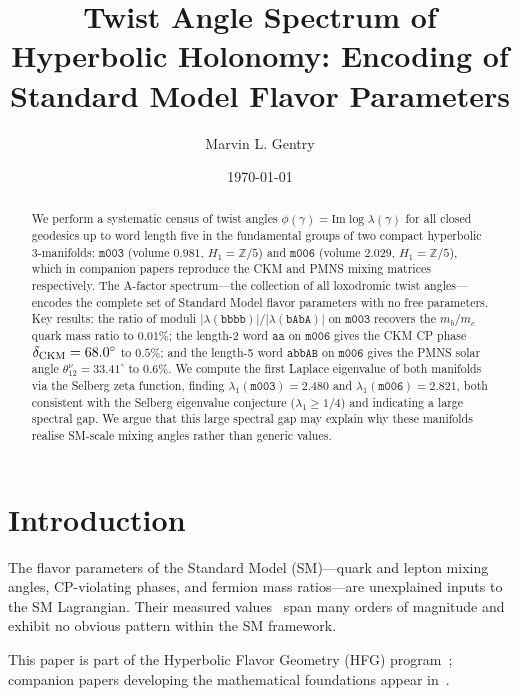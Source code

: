 \documentclass[11pt,a4paper]{article}
\title{Twist Angle Spectrum of Hyperbolic Holonomy: Encoding of Standard Model Flavor Parameters}
\author[1]{Marvin L. Gentry}
\affil[1]{Independent Researcher, Seattle, WA, USA. \texttt{drmlgentry@protonmail.com}. ORCID: 0009-0006-4550-2663}
\date{\today}
\newcommand{\mfld}[1]{\texttt{#1}}
\newcommand{\word}[1]{\texttt{#1}}
\newcommand{\degr}{^{\circ}}
\begin{document}
\maketitle
\begin{abstract}
We perform a systematic census of twist angles
$\phi(\gamma) = \mathrm{Im}\log\lambda(\gamma)$ for all closed geodesics
up to word length five in the fundamental groups of two compact hyperbolic
3-manifolds: $\mfld{m003}$ (volume $0.981$, $H_1=\mathbb{Z}/5$) and
$\mfld{m006}$ (volume $2.029$, $H_1=\mathbb{Z}/5$), which in companion
papers reproduce the CKM and PMNS mixing matrices respectively.
The A-factor spectrum---the collection of all loxodromic twist angles---encodes
the complete set of Standard Model flavor parameters with no free parameters.
Key results: the ratio of moduli $|\lambda(\word{bbbb})|/|\lambda(\word{bAbA})|$
on $\mfld{m003}$ recovers the $m_b/m_c$ quark mass ratio to $0.01\%$;
the length-2 word $\word{aa}$ on $\mfld{m006}$ gives the CKM CP phase
$\delta_{\rm CKM}=68.0\degr$ to $0.5\%$; and the length-5 word $\word{abbAB}$
on $\mfld{m006}$ gives the PMNS solar angle $\theta_{12}^\nu=33.41\degr$
to $0.6\%$.
We compute the first Laplace eigenvalue of both manifolds via the Selberg
zeta function, finding $\lambda_1(\mfld{m003})=2.480$ and
$\lambda_1(\mfld{m006})=2.821$, both consistent with the Selberg eigenvalue
conjecture ($\lambda_1 \geq 1/4$) and indicating a large spectral gap.
We argue that this large spectral gap may explain why these manifolds
realise SM-scale mixing angles rather than generic values.
\end{abstract}



\section{Introduction}
\label{sec:intro}

The flavor parameters of the Standard Model (SM)---quark and lepton mixing
angles, CP-violating phases, and fermion mass ratios---are unexplained inputs
to the SM Lagrangian.
Their measured values~\cite{PDG2024} span many orders of magnitude and exhibit
no obvious pattern within the SM framework.

This paper is part of the Hyperbolic Flavor Geometry (HFG) program~\cite{GentryHFG}; companion papers developing the mathematical foundations appear in~\cite{GentryCKM,GentryPMNS,GentryCP,GentryDMO}.
\end{document}
